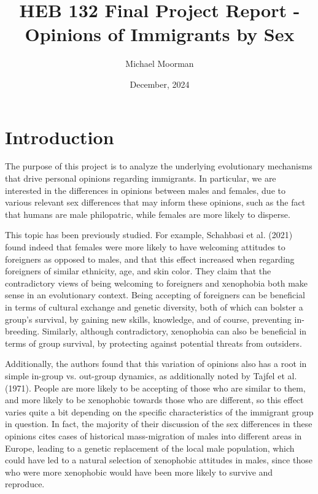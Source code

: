 \documentclass{article}
\title{HEB 132 Final Project Report - Opinions of Immigrants by Sex}
\author{Michael Moorman}
\date{December, 2024}
\begin{document}
\maketitle

\section{Introduction}

The purpose of this project is to analyze the underlying evolutionary mechanisms that drive personal opinions regarding immigrants. In particular, we are interested in the differences in opinions between males and females, due to various relevant sex differences that may inform these opinions, such as the fact that humans are male philopatric\cite{malePhilopatry}, while females are more likely to disperse\cite{femaleDispersal}. 

This topic has been previously studied. For example, Schahbasi et al. (2021) found indeed that females were more likely to have welcoming attitudes to foreigners as opposed to males, and that this effect increased when regarding foreigners of similar ethnicity, age, and skin color\cite{immigrantOpinions}. They claim that the contradictory views of being welcoming to foreigners and xenophobia both make sense in an evolutionary context. Being accepting of foreigners can be beneficial in terms of cultural exchange and genetic diversity, both of which can bolster a group's survival, by gaining new skills, knowledge, and of course, preventing in-breeding. Similarly, although contradictory, xenophobia can also be beneficial in terms of group survival, by protecting against potential threats from outsiders.

Additionally, the authors found that this variation of opinions also has a root in simple in-group vs. out-group dynamics, as additionally noted by Tajfel et al. (1971)\cite{ingroup}. People are more likely to be accepting of those who are similar to them, and more likely to be xenophobic towards those who are different, so this effect varies quite a bit depending on the specific characteristics of the immigrant group in question. In fact, the majority of their discussion of the sex differences in these opinions cites cases of historical mass-migration of males into different areas in Europe, leading to a genetic replacement of the local male population, which could have led to a natural selection of xenophobic attitudes
in males, since those who were more xenophobic would have been more likely to survive and reproduce.
\end{document}
